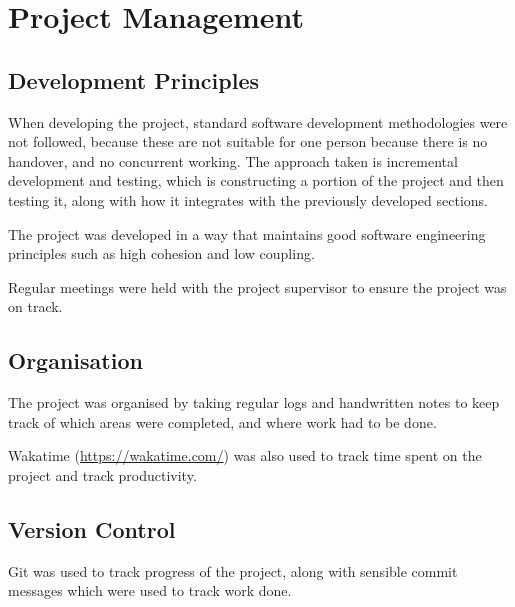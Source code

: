 \section{Project Management}
\subsection{Development Principles}
When developing the project, standard software development meth\-odologies were not followed, because these are not suitable for one person because there is no handover, and no concurrent working.
The approach taken is incremental development and testing, which is constructing a portion of the project and then testing it, along with how it integrates with the previously developed sections.\par
The project was developed in a way that maintains good software engineering principles such as high cohesion and low coupling.\par
Regular meetings were held with the project supervisor to ensure the project was on track.
\subsection{Organisation}
The project was organised by taking regular logs and handwritten notes to keep track of which areas were completed, and where work had to be done.\par
Wakatime (\url{https://wakatime.com/}) was also used to track time spent on the project and track productivity.
\subsection{Version Control}
Git was used to track progress of the project, along with sensible commit messages which were used to track work done.
